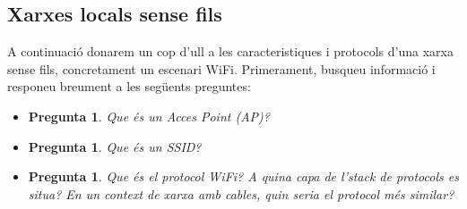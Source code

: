 \documentclass[12pt,a4paper]{article}
\newcounter{exercises}
\newtheorem{exer}[exercises]{Pregunta}
\begin{document}
\subsection{Xarxes locals sense fils}
A continuació donarem un cop d'ull a les caracteristiques i protocols d'una xarxa sense fils, concretament un escenari WiFi. 
Primerament, busqueu informació i responeu breument a les següents preguntes:

\begin{itemize}
\item \begin{exer} Que és un Acces Point (AP)?\end{exer}
\item \begin{exer} Que és un SSID? \end{exer}
\item \begin{exer} Que és el protocol WiFi? A quina capa de l'stack de protocols es situa? En un context de xarxa amb cables, quin seria el protocol més similar?\end{exer}
\end{itemize}
\end{document}

